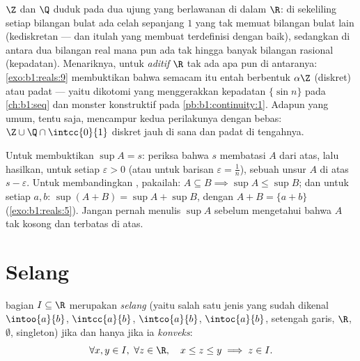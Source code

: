 \begin{remark}
 $\Z$ dan $\Q$ duduk pada dua ujung yang berlawanan di dalam $\R$: di sekeliling
setiap bilangan bulat ada celah sepanjang $1$ yang tak memuat bilangan bulat lain
(kediskretan --- dan itulah yang membuat  terdefinisi dengan baik),
sedangkan di antara dua bilangan real mana pun ada tak hingga banyak bilangan rasional
(kepadatan). Menariknya, untuk \emph{ aditif} $\R$
tak ada apa pun di antaranya: \cref{exo:b1:reals:9} membuktikan bahwa
 semacam itu entah berbentuk $\alpha\Z$ (diskret) atau
padat --- yaitu dikotomi yang menggerakkan kepadatan $\{\sin n\}$ pada
\cref{ch:b1:seq} dan monster konstruktif pada
\cref{pb:b1:continuity:1}. Adapun  yang umum, tentu saja, mencampur kedua
perilakunya dengan bebas: $\Z \cup \Q\cap\intcc{0}{1}$ diskret jauh
di sana dan padat di tengahnya.
\end{remark}

\begin{method}\label{met:b1:reals:supproofs}
Untuk membuktikan $\sup A = s$: periksa bahwa $s$ membatasi $A$ dari atas, lalu hasilkan,
untuk setiap $\varepsilon > 0$ (atau untuk barisan $\varepsilon = \frac
1n$), sebuah unsur $A$ di atas $s - \varepsilon$. Untuk membandingkan ,
pakailah: $A \subseteq B \implies \sup A \leq \sup B$; dan untuk setiap $a, b$:
$\sup(A + B) = \sup A + \sup B$, dengan $A + B = \{a + b\}$
(\cref{exo:b1:reals:5}). Jangan pernah menulis $\sup A$ sebelum mengetahui bahwa $A$
tak kosong dan terbatas di atas.
\end{method}

\section{Selang}

\begin{proposition}\label{prop:b1:reals:intervals}
 bagian $I \subseteq \R$ merupakan \emph{selang} (yaitu salah
satu jenis yang sudah dikenal $\intoo{a}{b}$, $\intcc{a}{b}$, $\intco{a}{b}$,
$\intoc{a}{b}$, setengah garis, $\R$, $\emptyset$, singleton) jika dan
hanya jika ia \emph{konveks}:
\[
\forall x, y \in I,\ \forall z \in \R, \quad
x \leq z \leq y \implies z \in I .
\]
\end{proposition}

